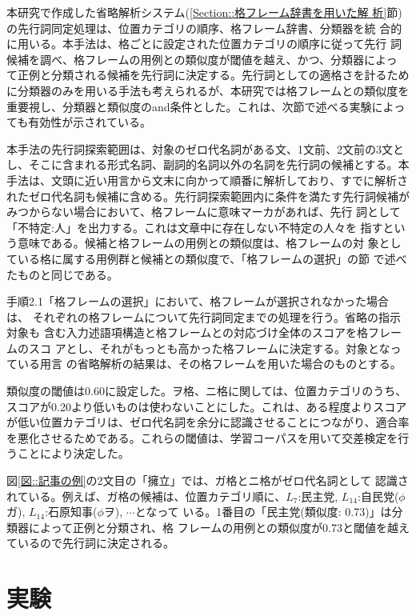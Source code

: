 \documentclass{nlp}
\begin{document}
本研究で作成した省略解析システム(\ref{Section::格フレーム辞書を用いた解
析}節)の先行詞同定処理は、位置カテゴリの順序、格フレーム辞書、分類器を統
合的に用いる。本手法は、格ごとに設定された位置カテゴリの順序に従って先行
詞候補を調べ、格フレームの用例との類似度が閾値を越え、かつ、分類器によっ
て正例と分類される候補を先行詞に決定する。先行詞としての適格さを計るため
に分類器のみを用いる手法も考えられるが、本研究では格フレームとの類似度を
重要視し、分類器と類似度のand条件とした。これは、次節で述べる実験によっ
ても有効性が示されている。

本手法の先行詞探索範囲は、対象のゼロ代名詞がある文、1文前、2文前の3文と
し、そこに含まれる形式名詞、副詞的名詞以外の名詞を先行詞の候補とする。本
手法は、文頭に近い用言から文末に向かって順番に解析しており、すでに解析さ
れたゼロ代名詞も候補に含める。先行詞探索範囲内に条件を満たす先行詞候補が
みつからない場合において、格フレームに意味マーカがあれば、先行
詞として「不特定:人」を出力する。これは文章中に存在しない不特定の人々を
指すという意味である。候補と格フレームの用例との類似度は、格フレームの対
象としている格に属する用例群と候補との類似度で、「格フレームの選択」の節
で述べたものと同じである。

手順2.1「格フレームの選択」において、格フレームが選択されなかった場合は、
それぞれの格フレームについて先行詞同定までの処理を行う。省略の指示対象も
含む入力述語項構造と格フレームとの対応づけ全体のスコアを格フレームのスコ
アとし、それがもっとも高かった格フレームに決定する。対象となっている用言
の省略解析の結果は、その格フレームを用いた場合のものとする。

類似度の閾値は0.60に設定した。ヲ格、ニ格に関しては、位置カテゴリのうち、
スコアが0.20より低いものは使わないことにした。これは、ある程度よりスコア
が低い位置カテゴリは、ゼロ代名詞を余分に認識させることにつながり、適合率
を悪化させるためである。これらの閾値は、学習コーパスを用いて交差検定を行
うことにより決定した。

図\ref{図::記事の例}の2文目の「擁立」では、ガ格とニ格がゼロ代名詞として
認識されている。例えば、ガ格の候補は、位置カテゴリ順に、$L_{7}$:民主党,
$L_{14}$:自民党($\phi$ガ), $L_{14}$:石原知事($\phi$ヲ), $\cdots$となって
いる。1番目の「民主党(類似度: 0.73)」は分類器によって正例と分類され、格
フレームの用例との類似度が0.73と閾値を越えているので先行詞に決定される。


\section{実験}
\label{Section::実験}
\end{document}
